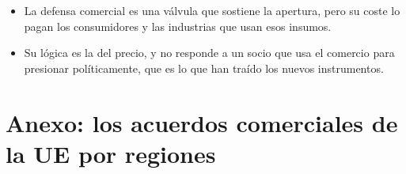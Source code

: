 \documentclass[11pt]{article}
\begin{document}
\begin{itemize}
\item La defensa comercial es una válvula que sostiene la apertura, pero su coste lo pagan los consumidores y las industrias que usan esos insumos.
\item Su lógica es la del precio, y no responde a un socio que usa el comercio para presionar políticamente, que es lo que han traído los nuevos instrumentos.
\end{itemize}

\section{Anexo: los acuerdos comerciales de la UE por regiones}\label{anexo:acuerdos}
\end{document}
